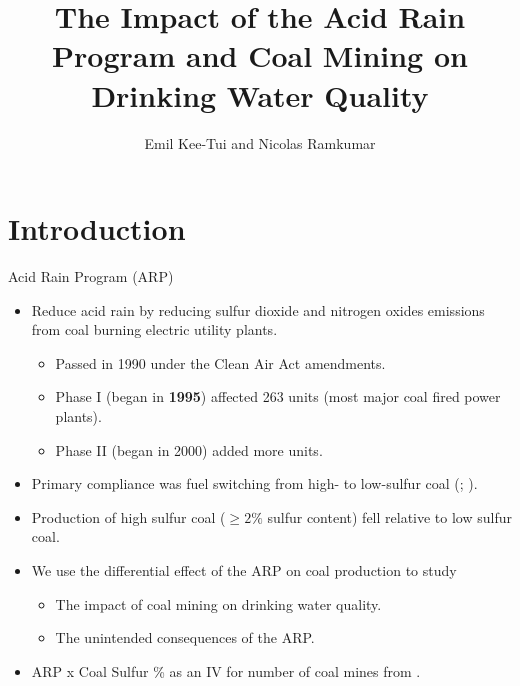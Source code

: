 \documentclass{beamer}
\title{The Impact of the Acid Rain Program and Coal Mining on Drinking Water Quality}
\author{Emil Kee-Tui and Nicolas Ramkumar}
\institute{Cornell University}
\begin{document}
\begin{frame}
\titlepage
\end{frame}

\section{Introduction}

\begin{frame}{Acid Rain Program (ARP)}
    \begin{itemize}
        \item Reduce acid rain by reducing sulfur dioxide and nitrogen oxides emissions from coal burning electric utility plants.
        \begin{itemize}
            \item Passed in 1990 under the Clean Air Act amendments.
            \item Phase I (began in \textbf{1995}) affected 263 units (most major coal fired power plants).
            \item Phase II (began in 2000) added more units.
        \end{itemize}         
        \item Primary compliance was fuel switching from high- to low-sulfur coal (\cite{schmalensee1998interim}; \cite{schmalensee2013so2}).
        \item Production of high sulfur coal ($\geq 2\%$ sulfur content) fell relative to low sulfur coal.
        \item We use the differential effect of the ARP on coal production to study \begin{itemize}
            \item The impact of coal mining on drinking water quality.
            \item The unintended consequences of the ARP.
        \end{itemize} 
        \item ARP x Coal Sulfur \% as an IV for number of coal mines from \cite{stratford2015coalprod}.
    \end{itemize}
\end{frame}
\end{document}
